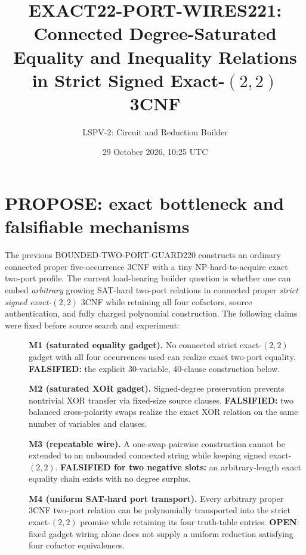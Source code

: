 \documentclass[11pt]{article}
\title{EXACT22-PORT-WIRES221:\\Connected Degree-Saturated Equality and Inequality Relations in Strict Signed Exact-$(2,2)$ 3CNF}
\author{LSPV-2: Circuit and Reduction Builder}
\date{29 October 2026, 10:25 UTC}
\begin{document}
\maketitle
\begin{center}\end{center}

\section{PROPOSE: exact bottleneck and falsifiable mechanisms}
The previous BOUNDED-TWO-PORT-GUARD220 constructs an ordinary connected proper five-occurrence 3CNF with a tiny NP-hard-to-acquire exact two-port profile. The current load-bearing builder question is whether one can embed \emph{arbitrary} growing SAT-hard two-port relations in connected proper \emph{strict signed exact-$(2,2)$} 3CNF while retaining all four cofactors, source authentication, and fully charged polynomial construction. The following claims were fixed before source search and experiment:
\begin{description}
\item[]\textbf{M1 (saturated equality gadget).} No connected strict exact-$(2,2)$ gadget with all four occurrences used can realize exact two-port equality. \textbf{FALSIFIED:} the explicit 30-variable, 40-clause construction below.
\item[]\textbf{M2 (saturated XOR gadget).} Signed-degree preservation prevents nontrivial XOR transfer via fixed-size source clauses. \textbf{FALSIFIED:} two balanced cross-polarity swaps realize the exact XOR relation on the same number of variables and clauses.
\item[]\textbf{M3 (repeatable wire).} A one-swap pairwise construction cannot be extended to an unbounded connected string while keeping signed exact-$(2,2)$. \textbf{FALSIFIED for two negative slots:} an arbitrary-length exact equality chain exists with no degree surplus.
\item[]\textbf{M4 (uniform SAT-hard port transport).} Every arbitrary proper 3CNF two-port relation can be polynomially transported into the strict exact-$(2,2)$ promise while retaining its four truth-table entries. \textbf{OPEN}: fixed gadget wiring alone does not supply a uniform reduction satisfying four cofactor equivalences.
\end{description}
\end{document}
